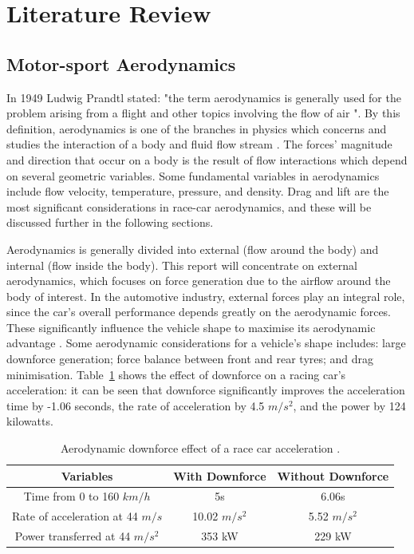 \section{Literature Review}

\subsection{Motor-sport Aerodynamics}
In 1949 Ludwig Prandtl stated: "the term aerodynamics is generally used for the problem arising from a flight and other topics involving the flow of air \cite{Anderson2010FundamentalsAerodynamics}". By this definition, aerodynamics is one of the branches in physics which concerns and studies the interaction of a body and fluid flow stream \cite{Scibor-Rylski1984RoadAerodynamics}. The forces' magnitude and direction that occur on a body is the result of flow interactions which depend on several geometric variables. Some fundamental variables in aerodynamics include flow velocity, temperature, pressure, and density. Drag and lift are the most significant considerations in race-car aerodynamics, and these will be discussed further in the following sections.

\noindent Aerodynamics is generally divided into external (flow around the body) and internal (flow inside the body). This report will concentrate on external aerodynamics, which focuses on force generation due to the airflow around the body of interest. In the automotive industry, external forces play an integral role, since the car's overall performance depends greatly on the aerodynamic forces. These significantly influence the vehicle shape to maximise its aerodynamic advantage \cite{Scibor-Rylski1984RoadAerodynamics}. Some aerodynamic considerations for a vehicle's shape includes: large downforce generation; force balance between front and rear tyres; and drag minimisation. Table~\ref{Table1} shows the effect of downforce on a racing car's acceleration: it can be seen that downforce significantly improves the acceleration time by -1.06 seconds, the rate of acceleration by 4.5 $m/s^2$, and the power by 124 kilowatts. 

\begin{table}[!ht]
\caption{\label{Table1} Aerodynamic downforce effect of a race car acceleration \cite{Scibor-Rylski1984RoadAerodynamics}.}
\vspace{-5mm}
\begin{center}
 \begin{tabular}{||c| c| c ||} 
 \hline
 Variables & With Downforce & Without Downforce \\ [0.5ex] 
 \hline\hline
 Time from 0 to 160 $km/h$ & 5s & 6.06s \\ 
 \hline
 Rate of acceleration at 44 $m/s$ & 10.02 $m/s^{2}$ & 5.52 $m/s^2$ \\
 \hline
 Power transferred at 44 $m/s^2$ & 353 kW & 229 kW  \\
 \hline
\end{tabular}
\end{center}
\end{table}

